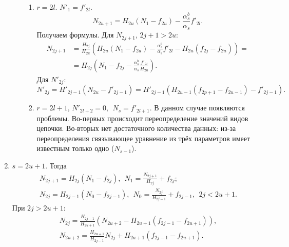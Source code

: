 \begin{enumerate}
\begin{enumerate}
        \begin{enumerate}
            \item \(r = 2l\). \(N'_1 = f'_{2l}\).
            \begin{equation*}
                N_{2u+1} = H_{2u} (N_1 - f_{2u}) - \frac{\alpha^b_s}{\alpha_s} f'_{2l}.
            \end{equation*}
            Получаем формулы. Для \(N_{2j+1}\), \(2j+1 > 2u\):
            \begin{equation*}
                \begin{split}
                    N_{2j+1} &= \frac{H_{2j}}{H_{2u}} \left( H_{2u} (N_1 - f_{2u}) - \frac{\alpha^b_s}{\alpha_s} f'_{2l} - H_{2u} (f_{2j} - f_{2u}) \right) = \\
                    & = H_{2j} \left( N_1 - f_{2j} - \frac{\alpha^b_s}{\alpha_s} \frac{ f'_{2l} }{H_{2u}} \right).
                \end{split}
            \end{equation*}
            Для \(N'_{2j}\):
            \begin{equation*}
                N'_{2j} = H'_{2j-1} (N_{2u} - f'_{2j-1}) = H'_{2j-1} \left( H_{2u-1} (f_{2p+1} - f_{2u-1}) - f'_{2j-1} \right).
            \end{equation*}

            \item \(r=2l+1\), \(N'_{2l+2} = 0, ~~ N_s = f'_{2l+1}\).
            В данном случае появляются проблемы. Во-первых происходит переопределение значений видов цепочки. Во-вторых нет достаточного количества данных: из-за переопределения связывающее уравнение из трёх параметров имеет известным только одно (\(N_{s-1}\)). %
        \end{enumerate} %

    \end{enumerate} %

    \item \(s = 2u+1\). Тогда 
    \begin{equation*}
        \begin{split}
            & N_{2j+1} = H_{2j} (N_1 - f_{2j}), ~~ N_1 = \frac{N_{2j+1}}{H_{2j}} + f_{2j}; \\
            & N_{2j} = H_{2j-1} (N_0 - f_{2j-1}), ~~ N_0 = \frac{N_{2j}}{H_{2j-1}} + f_{2j-1}, ~~ 2j < 2u+1.
        \end{split}
    \end{equation*}
    При \(2j > 2u+1\):
    \begin{equation*}
        \begin{split}
            & N_{2j} = \frac{H_{2j-1}}{H_{2u+1}} \left( N_{2u+2} - H_{2u+1} (f_{2j-1} - f_{2u+1}) \right),\\
            & N_{2u+2} = \frac{H_{2u+1}}{H_{2j-1}} N_{2j} + H_{2u+1} (f_{2j-1} - f_{2u+1}).
        \end{split}
    \end{equation*}


\end{enumerate}
